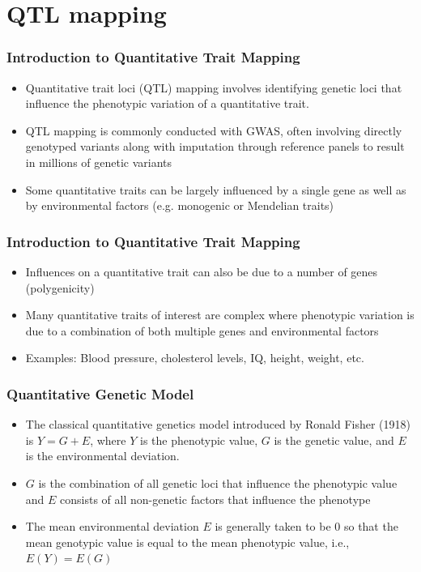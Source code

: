 \documentclass{beamer}
\begin{document}
\section{QTL mapping}


\begin{frame}
	\frametitle{\bf Introduction to Quantitative Trait Mapping}
	\begin{itemize}
		\item Quantitative trait loci (QTL) mapping involves identifying genetic loci that influence the phenotypic variation of a quantitative trait.
		\item QTL mapping is commonly conducted with GWAS, often involving directly genotyped variants along with imputation through reference panels to result in millions of genetic variants
		\item	Some quantitative traits can be largely influenced by a single gene as well as by environmental factors (e.g. monogenic or Mendelian traits)
	\end{itemize}
\end{frame}

\begin{frame}
	\frametitle{\bf Introduction to Quantitative Trait Mapping}
	\begin{itemize}
		\item  Influences on a quantitative trait can also be due to a number of genes  (polygenicity)
		\item Many quantitative traits of interest are complex where phenotypic variation is due to a combination of both multiple genes and environmental factors
		\item Examples: Blood pressure, cholesterol levels, IQ, height, weight, etc.
	\end{itemize}
\end{frame}


\begin{frame}
	\frametitle{\bf Quantitative Genetic Model}
	\begin{itemize}
		\item The classical quantitative genetics model introduced by Ronald Fisher (1918) is $Y=G+E $, where $Y$ is the phenotypic value, $G$ is the genetic value, and $E$ is the environmental deviation.
		\item $G$ is the combination of all genetic loci that influence the phenotypic value  and $E$ consists of all non-genetic factors that influence the phenotype
		\item The mean environmental deviation $E$ is generally taken to be 0 so that the mean genotypic value is equal to the mean phenotypic value, i.e., $E(Y)=E(G)$
	\end{itemize}
\end{frame}
\end{document}
